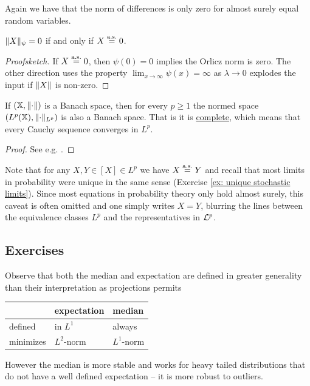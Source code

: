 Again we have that the norm of differences is only zero for almost surely equal
random variables.

\begin{fact}
    \(\lVert X\rVert_\psi = 0\) if and only if \(X\overset{\operatorname{\text{a.s.}}}= 0\).
\end{fact}
\begin{proof}[Proofsketch]
    If \(X \overset{\operatorname{\text{a.s.}}}= 0\), then \(\psi(0)=0\) implies the Orlicz
    norm is zero. The other direction uses the property \(\lim_{x\to\infty}
    \psi(x) = \infty\) as \(\lambda \to 0\) explodes the input if \(\lVert X\rVert\)
    is non-zero.
\end{proof}

\begin{fact}
    \label{fact: Lp complete}
    If \((\mathbb{X}, \lVert\cdot\rVert)\) is a Banach space, then for every \(p \ge 1\)
    the normed space \((L^p(\mathbb{X}), \lVert\cdot\rVert_{L^p})\) is
    also a Banach space. That is it is \underline{complete},
    which means that every Cauchy sequence converges in \(L^p\). 
\end{fact}
\begin{proof}
See e.g. \citep[Thm.~6.25 and 7.3]{klenkeProbabilityTheoryComprehensive2014}.
\end{proof}

Note that for any \(X,Y\in [X] \in L^p\) we have \(X\overset{\operatorname{\text{a.s.}}}= Y\)
and recall that most limits in probability were unique in the same sense
(Exercise \ref{ex: unique stochastic limits}).
Since most equations in probability theory only hold almost surely, this caveat
is often omitted and one simply writes \(X=Y\), blurring the lines
between the equivalence classes \(L^p\) and the representatives in \(\mathcal{L}^p\).

\subsection*{Exercises \thesection}






\begin{remark}
    Observe that both the median and expectation are defined in greater
    generality than their interpretation as projections permits
    \begin{center}
       \def\arraystretch{1.2} 
    \begin{tabular}{l|ll}
        & expectation & median 
        \\
        \hline
        defined & in \(L^1\) & always
        \\
        minimizes & \(L^2\)-norm & \(L^1\)-norm
    \end{tabular}
    \end{center}
    However the median is more stable and works for heavy tailed
    distributions that do not have a well defined expectation -- it is
    more robust to outliers.
\end{remark}

